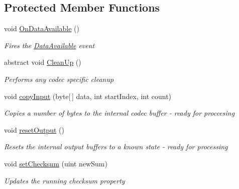 \subsection*{Protected Member Functions}
\begin{DoxyCompactItemize}
\item 
void \hyperlink{class_dot_z_lib_1_1_codec_base_a5c697195bc017ae951858e7c8948f9ae}{On\+Data\+Available} ()
\begin{DoxyCompactList}\small\item\em Fires the \hyperlink{class_dot_z_lib_1_1_codec_base_a985cf58f6ed5cfeeb9fd8c34a7c052d4}{Data\+Available} event \end{DoxyCompactList}\item 
abstract void \hyperlink{class_dot_z_lib_1_1_codec_base_aa0ded075105c5cf6f5f0d61928c90ca6}{Clean\+Up} ()
\begin{DoxyCompactList}\small\item\em Performs any codec specific cleanup \end{DoxyCompactList}\item 
void \hyperlink{class_dot_z_lib_1_1_codec_base_a8c827f091195356490e7f8b69e0546a7}{copy\+Input} (byte\mbox{[}$\,$\mbox{]} data, int start\+Index, int count)
\begin{DoxyCompactList}\small\item\em Copies a number of bytes to the internal codec buffer -\/ ready for proccesing \end{DoxyCompactList}\item 
void \hyperlink{class_dot_z_lib_1_1_codec_base_a801b625073b21aeaab52ebf9e96dd9c9}{reset\+Output} ()
\begin{DoxyCompactList}\small\item\em Resets the internal output buffers to a known state -\/ ready for processing \end{DoxyCompactList}\item 
void \hyperlink{class_dot_z_lib_1_1_codec_base_a5dfa2dddf3ac857652af7fd8e3d2034d}{set\+Checksum} (uint new\+Sum)
\begin{DoxyCompactList}\small\item\em Updates the running checksum property \end{DoxyCompactList}\end{DoxyCompactItemize}
